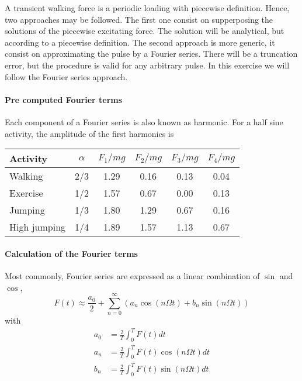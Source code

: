 \begin{Answer}[ref={footfall_analysis}]
A transient walking force is a periodic loading with piecewise definition. Hence, two approaches may be followed. The first one consist on supperposing the solutions of the piecewise excitating force. The solution will be analytical, but according to a piecewise definition. The second approach is more generic, it consist on approximating the pulse by a Fourier series. There will be a truncation error, but the procedure is valid for any arbitrary pulse. In this exercise we will follow the Fourier series approach.



\paragraph{Pre computed Fourier terms}
Each component of a Fourier series is also known as harmonic. For a half sine activity, the amplitude of the first harmonics is

\begin{center}
\begin{tabular}{|l|c|cccc|}
    \hline
    Activity & $\alpha$ & $F_1/mg$ & $F_2/mg$ & $F_3/mg$ & $F_4/mg$ \\ \hline
    Walking  &    2/3   &   1.29   &   0.16   &   0.13   &   0.04   \\
    Exercise &    1/2   &   1.57   &   0.67   &   0.00   &   0.13   \\
    Jumping  &    1/3   &   1.80   &   1.29   &   0.67   &   0.16   \\
    High jumping & 1/4  &   1.89   &   1.57   &   1.13   &   0.67   \\ \hline
\end{tabular}
\end{center}


\paragraph{Calculation of the Fourier terms}
Most commonly, Fourier series are expressed as a linear combination of $\sin$ and $\cos$,
$$
F(t) \approx \frac{a_0}{2} + \sum_{n=0}^{\infty} \left(a_n\cos(n\Omega t) + b_n\sin(n\Omega t)\right)
$$
with
\begin{align*}
a_0 &= \frac{2}{T}\int_{0}^{T} F(t) dt \\
a_n &= \frac{2}{T}\int_{0}^{T} F(t) \cos(n\Omega t) dt \\
b_n &= \frac{2}{T}\int_{0}^{T} F(t) \sin(n\Omega t) dt \\
\end{align*}


\end{Answer}
